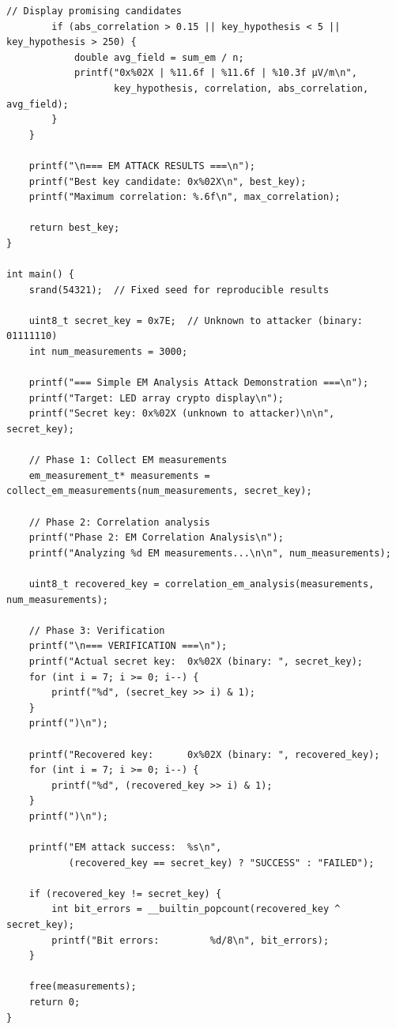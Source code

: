 \documentclass[11pt,a4paper]{article}
\theoremstyle{definition}
\begin{document}
\begin{lstlisting}[caption={Complete EM Attack Implementation}]
        // Display promising candidates
        if (abs_correlation > 0.15 || key_hypothesis < 5 || key_hypothesis > 250) {
            double avg_field = sum_em / n;
            printf("0x%02X | %11.6f | %11.6f | %10.3f μV/m\n", 
                   key_hypothesis, correlation, abs_correlation, avg_field);
        }
    }
    
    printf("\n=== EM ATTACK RESULTS ===\n");
    printf("Best key candidate: 0x%02X\n", best_key);
    printf("Maximum correlation: %.6f\n", max_correlation);
    
    return best_key;
}

int main() {
    srand(54321);  // Fixed seed for reproducible results
    
    uint8_t secret_key = 0x7E;  // Unknown to attacker (binary: 01111110)
    int num_measurements = 3000;
    
    printf("=== Simple EM Analysis Attack Demonstration ===\n");
    printf("Target: LED array crypto display\n");
    printf("Secret key: 0x%02X (unknown to attacker)\n\n", secret_key);
    
    // Phase 1: Collect EM measurements
    em_measurement_t* measurements = collect_em_measurements(num_measurements, secret_key);
    
    // Phase 2: Correlation analysis
    printf("Phase 2: EM Correlation Analysis\n");
    printf("Analyzing %d EM measurements...\n\n", num_measurements);
    
    uint8_t recovered_key = correlation_em_analysis(measurements, num_measurements);
    
    // Phase 3: Verification
    printf("\n=== VERIFICATION ===\n");
    printf("Actual secret key:  0x%02X (binary: ", secret_key);
    for (int i = 7; i >= 0; i--) {
        printf("%d", (secret_key >> i) & 1);
    }
    printf(")\n");
    
    printf("Recovered key:      0x%02X (binary: ", recovered_key);
    for (int i = 7; i >= 0; i--) {
        printf("%d", (recovered_key >> i) & 1);
    }
    printf(")\n");
    
    printf("EM attack success:  %s\n", 
           (recovered_key == secret_key) ? "SUCCESS" : "FAILED");
    
    if (recovered_key != secret_key) {
        int bit_errors = __builtin_popcount(recovered_key ^ secret_key);
        printf("Bit errors:         %d/8\n", bit_errors);
    }
    
    free(measurements);
    return 0;
}
\end{lstlisting}
\end{document}
